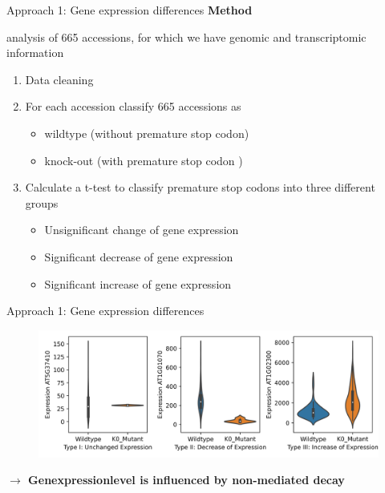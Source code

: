 \documentclass{beamer}
\begin{document}
\begin{frame}{Approach 1: Gene expression differences}
	\textbf{Method}

	analysis of  665 accessions, for which we have genomic and transcriptomic information
	
	\vspace{5mm}
	\begin{enumerate}
		\item[1.)] Data cleaning
		\item[2.)] For each accession classify 665 accessions as
		\begin{itemize}
			\item wildtype (without premature stop codon)
			\item knock-out (with premature stop codon )
		\end{itemize} 
		\item[3.)] Calculate a t-test to classify premature stop codons into three different groups
		\begin{itemize}
			\item Unsignificant change of gene expression
			\item Significant decrease of gene expression 
			\item Significant increase of gene expression
		\end{itemize}  
	\end{enumerate}
\end{frame}
\begin{frame}{Approach 1: Gene expression differences}
	\begin{figure}[tb]
		\centering
		\begin{minipage}[h]{1\textwidth}
		\centering
		\includegraphics[width=1\textwidth]{images/Cathegories_Premature_Stop_Codons.png}
		\label{fig:Cathegories}
		\end{minipage}
	\end{figure}
	\textbf{$\rightarrow$ Genexpressionlevel is influenced by non-mediated decay}
\end{frame}
\end{document}
